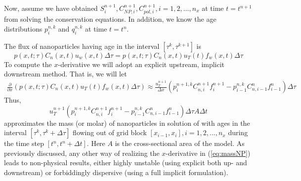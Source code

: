 \documentclass[nanomaterials,article,submit,moreauthors,pdftex]{Definitions/mdpi}
\begin{document}
Now, assume we have obtained $S^{n+1}_{i}, C^{n+1}_{\textit{NP}, i}, C^{n+1}_{pol, i}, i=1,2,...,n_x$ at time $t=t^{n+1}$ from solving the conservation equations. In addition, we know the age distributions $p^{n,k}_i$ and $q^{n,k}_i$ at time $t=t^{n}$.

The flux of nanoparticles having age in the interval $\left[\tau^k, \tau^{k+1}\right]$ is
\begin{equation}
    p(x,t;\tau)C_n(x,t)u_w(x,t)\Delta\tau = p(x,t;\tau)C_n(x,t)u_T(t)f_w(x,t)\Delta\tau
\end{equation}
To compute the  $x$-derivative we will adopt an explicit upstream, implicit downstream method. That is, we will let
\begin{multline}
    \frac{\partial}{\partial x} \left(p(x,t;\tau)C_n(x,t)u_T(t)f_w(x,t)\Delta\tau\right) \approx \frac{u_T^{n+1}}{\Delta x} \left(p_i^{n+1,k}C_{n,i}^{n+1}f_i^{n+1}- p_{i-1}^{n,k}C_{n,i-1}^{n}f_{i-1}^{n}\right)\Delta\tau
\end{multline}
Thus,
\begin{equation} \label{eq:massNP} %
    u_T^{n+1} \left(p_i^{n+1,k}C_{n,i}^{n+1}f_i^{n+1}- p_{i-1}^{n,k}C_{n,i-1}^{n}f_{i-1}^{n}\right)\Delta\tau A\Delta t
\end{equation}
approximates the mass (or molar) of nanoparticles in solution of with ages in the interval $\left[\tau^k, \tau^k+\Delta\tau\right]$  flowing out of grid block $\left[x_{i-1},x_i\right],i=1,2,...,n_x$ during the time step  $\left[t^n, t^n+\Delta t\right]$. Here $A$ is the cross-sectional area of the model. As previously discussed, any other way of realizing the  $x$-derivative in (\ref{eq:massNP}) leads to non-physical results, either highly unstable (using explicit both up- and downstream) or forbiddingly dispersive (using a full implicit formulation). 
\end{document}
